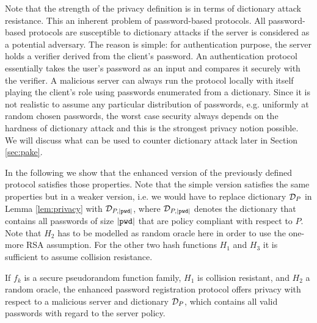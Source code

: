 Note that the strength of the privacy definition is in terms of dictionary attack resistance. 
This an inherent problem of password-based protocols. 
All password-based protocols are susceptible to dictionary attacks if the server is considered as a potential adversary. 
The reason is simple: for authentication purpose, the server holds a verifier derived from the client's password. 
An authentication protocol essentially takes the user's password as an input and compares it securely with the verifier. 
A malicious server can always run the protocol locally with itself playing the client's role using passwords enumerated from a dictionary.  Since it is not realistic to assume any particular distribution of passwords, e.g. uniformly at random chosen passwords, the worst case security always depends on the hardness of dictionary attack and this is the strongest privacy notion possible. We will discuss what can be used to counter dictionary attack later in Section \ref{sec:pake}.

In the following we show that the enhanced version of the previously defined protocol satisfies those properties.
Note that the simple version satisfies the same properties but in a weaker version, i.e. we would have to replace dictionary $\mathcal{D}_P$ in Lemma \ref{lem:privacy} with $\mathcal{D}_{P,|\mathtt{pwd}|}$, where $\mathcal{D}_{P,|\mathtt{pwd}|}$ denotes the dictionary that contains all passwords of size $|\mathtt{pwd}|$ that are policy compliant with respect to $P$.
Note that $H_2$ has to be modelled as random oracle here in order to use the one-more RSA assumption.
For the other two hash functions $H_1$ and $H_3$ it is sufficient to assume collision resistance.

\begin{lemma}[Privacy]\label{lem:privacy}
If $f_k$ is a secure pseudorandom function family, $H_1$ is collision resistant, and $H_2$ a random oracle, the enhanced password registration protocol offers privacy with respect to a malicious server and dictionary $\mathcal{D}_P$, which contains all valid passwords with regard to the server policy.
\end{lemma}

